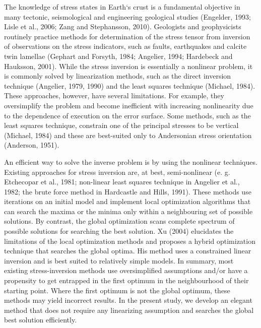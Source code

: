\onehalfspacing
The knowledge of stress states in Earth`s crust is a fundamental objective in many tectonic, seismological and engineering geological studies (Engelder, 1993; Lisle et al., 2006; Zang and Stephansson, 2010). Geologists and geophysicists routinely practice methods for determination of the stress tensor from inversion of observations on the stress indicators, such as faults, earthquakes and calcite twin lamellae (Gephart and Forsyth, 1984; Angelier, 1994; Hardebeck and Hauksson, 2001). While the stress inversion is essentially a nonlinear problem, it is commonly solved by linearization methods, such as the direct inversion technique (Angelier, 1979, 1990) and the least squares technique (Michael, 1984). These approaches, however, have several limitations. For example, they oversimplify the problem and become inefficient with increasing nonlinearity due to the dependence of execution on the error surface. Some methods, such as the least squares technique, constrain one of the principal stresses to be vertical (Michael, 1984) and these are best-suited only to Andersonian stress orientation (Anderson, 1951).

An efficient way to solve the inverse problem is by using the nonlinear techniques. Existing approaches for stress inversion are, at best, semi-nonlinear (e. g. Etchecopar et al., 1981; non-linear least squares technique in Angelier et al., 1982; the brute force method in Hardcastle and Hills, 1991). These methods use iterations on an initial model and implement local optimization algorithms that can search the maxima or the minima only within a neighbouring set of possible solutions. By contrast, the global optimization scans complete spectrum of possible solutions for searching the best solution. Xu (2004) elucidates the limitations of the local optimization methods and proposes a hybrid optimization technique that searches the global optima. His method uses a constrained linear inversion and is best suited to relatively simple models. In summary, most existing stress-inversion methods use oversimplified assumptions and/or have a propensity to get entrapped in the first optimum in the neighbourhood of their starting point. Where the first optimum is not the global optimum, these methods may yield incorrect results. In the present study, we develop an elegant method that does not require any linearizing assumption and searches the global best solution efficiently.

